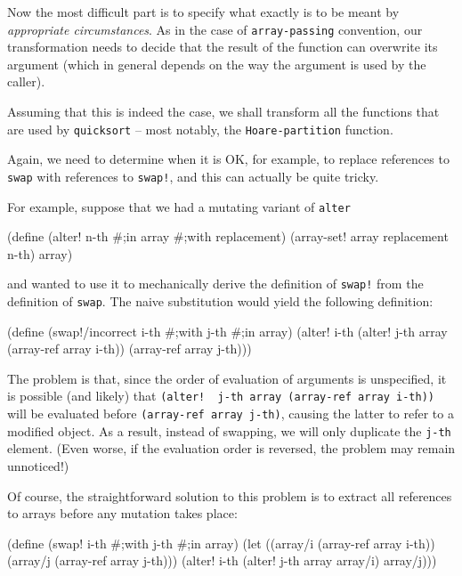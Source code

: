 Now the most difficult part is to specify what exactly is to be meant
by \textit{appropriate circumstances}. As in the case of
\texttt{array-passing} convention, our transformation
needs to decide that the result of the function can overwrite its argument
(which in general depends on the way the argument is used by the caller).

Assuming that this is indeed the case, we shall transform all the functions
that are used by \texttt{quicksort} -- most notably,
the \texttt{Hoare\--partition} function.

Again, we need to determine when it is OK, for example, to replace
references to \texttt{swap} with references to \texttt{swap!}, and
this can actually be quite tricky.

For example, suppose that we had a mutating variant of \texttt{alter}

\begin{Snippet}
(define (alter! n-th #;in array #;with replacement)
  (array-set! array replacement n-th)
  array)
\end{Snippet}

and wanted to use it to mechanically derive the definition of \texttt{swap!}
from the definition of \texttt{swap}. The naive substitution would yield
the following definition:

\begin{Snippet}
(define (swap!/incorrect i-th #;with j-th #;in array)
  (alter! i-th (alter! j-th array (array-ref array i-th))
	 (array-ref array j-th)))
\end{Snippet}

The problem is that, since the order of evaluation of arguments
is unspecified, it is possible (and likely) that
\texttt{(alter!\,\,j-th array (array-ref array i-th))} will
be evaluated before \texttt{(array-ref array j-th)}, causing the
latter to refer to a modified object. As a result, instead of swapping,
we will only duplicate the \texttt{j-th} element. (Even worse,
if the evaluation order is reversed, the problem may remain unnoticed!)

Of course, the straightforward solution to this problem is to extract
all references to arrays before any mutation takes place:

\begin{Snippet}
(define (swap! i-th #;with j-th #;in array)
  (let ((array/i (array-ref array i-th))
        (array/j (array-ref array j-th)))
    (alter! i-th (alter! j-th array array/i) array/j)))
\end{Snippet}

